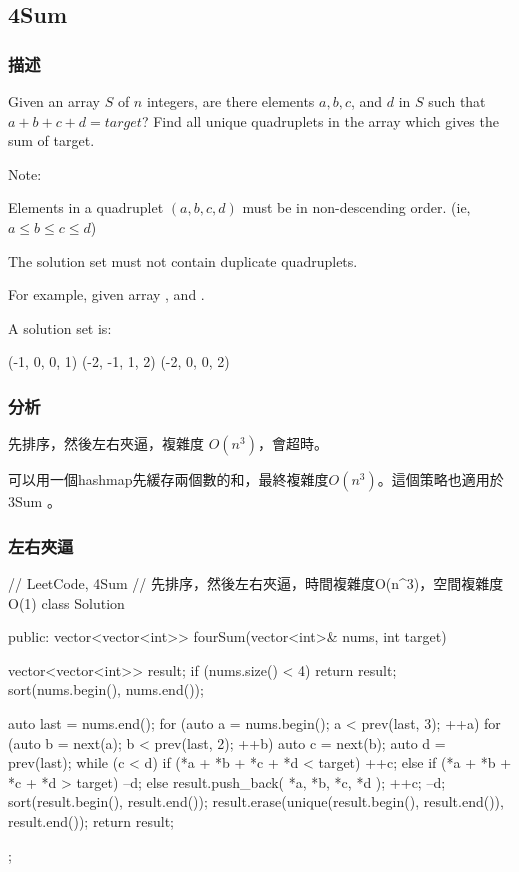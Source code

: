 \subsection{4Sum} %
\label{sec:4sum}


\subsubsection{描述}
Given an array $S$ of $n$ integers, are there elements $a, b, c$, and $d$ in $S$ such that $a + b + c + d = target$? Find all unique quadruplets in the array which gives the sum of target.

Note:
\begindot
\item Elements in a quadruplet $(a,b,c,d)$ must be in non-descending order. (ie, $a \leq b \leq c \leq d$)
\item The solution set must not contain duplicate quadruplets.
\myenddot

For example, given array , and . 

A solution set is:
\begin{Code}
(-1,  0, 0, 1)
(-2, -1, 1, 2)
(-2,  0, 0, 2)
\end{Code}


\subsubsection{分析}
先排序，然後左右夾逼，複雜度 $O(n^3)$，會超時。

可以用一個hashmap先緩存兩個數的和，最終複雜度$O(n^3)$。這個策略也適用於 3Sum 。


\subsubsection{左右夾逼}
\begin{Code}
// LeetCode, 4Sum
// 先排序，然後左右夾逼，時間複雜度O(n^3)，空間複雜度O(1)
class Solution {
public:
    vector<vector<int>> fourSum(vector<int>& nums, int target) {
        vector<vector<int>> result;
        if (nums.size() < 4) return result;
        sort(nums.begin(), nums.end());

        auto last = nums.end();
        for (auto a = nums.begin(); a < prev(last, 3); ++a) {
            for (auto b = next(a); b < prev(last, 2); ++b) {
                auto c = next(b);
                auto d = prev(last);
                while (c < d) {
                    if (*a + *b + *c + *d < target) {
                        ++c;
                    } else if (*a + *b + *c + *d > target) {
                        --d;
                    } else {
                        result.push_back({ *a, *b, *c, *d });
                        ++c;
                        --d;
                    }
                }
            }
        }
        sort(result.begin(), result.end());
        result.erase(unique(result.begin(), result.end()), result.end());
        return result;
    }
};
\end{Code}


